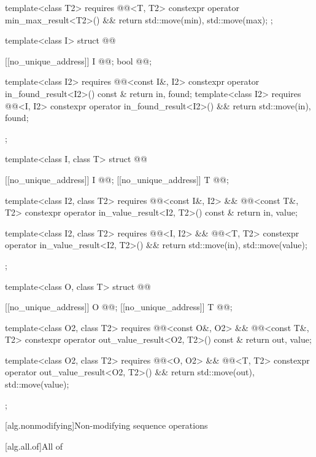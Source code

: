 \begin{codeblock}
{{    template<class T2>
      requires @@<T, T2>
    constexpr operator min_max_result<T2>() && {
      return {std::move(min), std::move(max)};
    }
  };

  template<class I>
  struct @@ {
    [[no_unique_address]] I @@;
    bool @@;

    template<class I2>
      requires @@<const I&, I2>
    constexpr operator in_found_result<I2>() const & {
      return {in, found};
    }
    template<class I2>
      requires @@<I, I2>
    constexpr operator in_found_result<I2>() && {
      return {std::move(in), found};
    }
  };

  template<class I, class T>
  struct @@ {
    [[no_unique_address]] I @@;
    [[no_unique_address]] T @@;

    template<class I2, class T2>
      requires @@<const I&, I2> && @@<const T&, T2>
    constexpr operator in_value_result<I2, T2>() const & {
      return {in, value};
    }

    template<class I2, class T2>
      requires @@<I, I2> && @@<T, T2>
    constexpr operator in_value_result<I2, T2>() && {
      return {std::move(in), std::move(value)};
    }
  };

  template<class O, class T>
  struct @@ {
    [[no_unique_address]] O @@;
    [[no_unique_address]] T @@;

    template<class O2, class T2>
      requires @@<const O&, O2> && @@<const T&, T2>
    constexpr operator out_value_result<O2, T2>() const & {
      return {out, value};
    }

    template<class O2, class T2>
      requires @@<O, O2> && @@<T, T2>
    constexpr operator out_value_result<O2, T2>() && {
      return {std::move(out), std::move(value)};
    }
  };
}
\end{codeblock}

[alg.nonmodifying]{Non-modifying sequence operations}

[alg.all.of]{All of}

